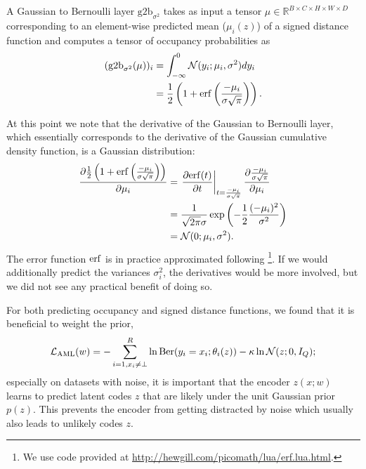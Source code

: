 \begin{definition}
  A Gaussian to Bernoulli layer $\text{g2b}_{\sigma^2}$ takes as input
  a tensor $\mu \in \mathbb{R}^{B \times C \times H \times W \times D}$ corresponding
  to an element-wise predicted mean (\ie $\mu_i(z)$) of a signed
  distance function and computes a tensor of occupancy probabilities as
  \begin{align}
    (\text{g2b}_{\sigma^2}(\mu))_i &= \int_{-\infty}^0 \mathcal{N}(y_i; \mu_i, \sigma^2) dy_i\\
    &= \frac{1}{2}\left(1 + \mathrm{erf}\left(\frac{-\mu_i}{\sigma \sqrt{\pi}}\right)\right).
  \end{align}
\end{definition}

At this point we note that the derivative of the Gaussian to Bernoulli
layer, which essentially corresponds to the derivative of the Gaussian
cumulative density function, is a Gaussian distribution:
\begin{align}
  \frac{\partial \frac{1}{2}\left(1 + \mathrm{erf}\left(\frac{-\mu_i}{\sigma \sqrt{\pi}}\right)\right)}{\partial \mu_i} &= \left.\frac{\partial \mathrm{erf}(t)}{\partial t}\right|_{t = \frac{-\mu_i}{\sigma\sqrt{\pi}}} \frac{\partial \frac{-\mu_i}{\sigma\sqrt{\pi}}}{\partial \mu_i}\\
  &=\frac{1}{\sqrt{2\pi}\sigma} \exp\left( -\frac{1}{2} \frac{(-\mu_i)^2}{\sigma^2}\right)\\
  &= \mathcal{N}(0; \mu_i, \sigma^2).
\end{align}
The error function $\mathrm{erf}$ is in practice approximated following \cite{Abramowitz:1974}\footnote{
  We use code provided at \url{http://hewgill.com/picomath/lua/erf.lua.html}.
}. If we would additionally predict the variances $\sigma_i^2$, the
derivatives would be more involved, but we did not see any practical benefit of
doing so.

For both predicting occupancy and signed distance functions,
we found that it is beneficial to weight the prior, \eg
\begin{align}
  \mathcal{L}_{\text{AML}}(w) = - \sum_{i = 1,x_i \neq \bot}^R \ln \mathrm{Ber}(y_i = x_i; \theta_i(z)) - \kappa \ln \mathcal{N}(z;0,I_Q);
  \label{eq:shape-inference-aml-weighted-loss}
\end{align}
especially on datasets with noise, it is important that the encoder
$z(x;w)$ learns to predict latent codes $z$ that are likely under the
unit Gaussian prior $p(z)$. This prevents the encoder from getting distracted
by noise which usually also leads to unlikely codes $z$.

